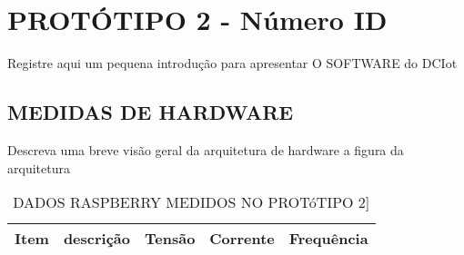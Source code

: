 \section{PROTÓTIPO 2 - Número ID}
Registre aqui um pequena introdução para apresentar O SOFTWARE do DCIot
\subsection{MEDIDAS DE HARDWARE}
Descreva uma breve visão geral da arquitetura de hardware a figura da arquitetura
\begin{table}
	\centering
	\caption{DADOS RASPBERRY MEDIDOS NO PROTóTIPO 2]}
	\begin{tabular}{ |c | p{3cm}| p{3cm} |p{3cm} | p{3cm} | } \hline
		\textbf{ Item} 	   & \textbf{descrição}	&\textbf{Tensão} &\textbf{Corrente} &\textbf{Frequência} \\ \hline
		

\end{tabular}
\end{table}
